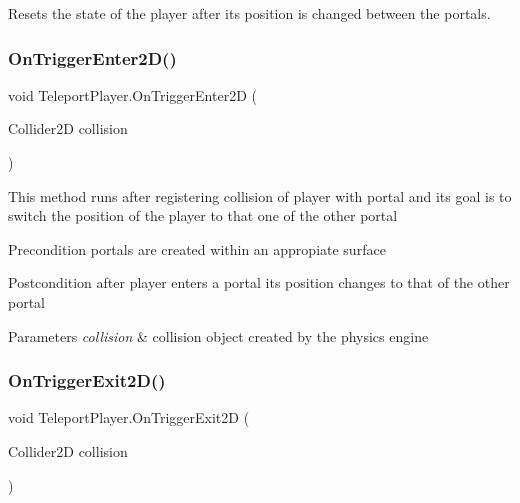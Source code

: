Resets the state of the player after its position is changed between the portals. \mbox{\label{class_teleport_player_a555b0c226c512d6bc9ce347b19957cd9}} 
\subsubsection{\texorpdfstring{On\+Trigger\+Enter2\+D()}{OnTriggerEnter2D()}}
{\footnotesize\ttfamily void Teleport\+Player.\+On\+Trigger\+Enter2D (\begin{DoxyParamCaption}\item[{Collider2D}]{collision }\end{DoxyParamCaption})\hspace{0.3cm}{\ttfamily [inline]}}

This method runs after registering collision of player with portal and its goal is to switch the position of the player to that one of the other portal \begin{DoxyPrecond}{Precondition}
portals are created within an appropiate surface 
\end{DoxyPrecond}
\begin{DoxyPostcond}{Postcondition}
after player enters a portal it\textquotesingle{}s position changes to that of the other portal 
\end{DoxyPostcond}

\begin{DoxyParams}{Parameters}
{\em collision} & collision object created by the physics engine \\
\hline
\end{DoxyParams}
\mbox{\label{class_teleport_player_addd6af261867cf134ac87c580cebec92}} 
\subsubsection{\texorpdfstring{On\+Trigger\+Exit2\+D()}{OnTriggerExit2D()}}
{\footnotesize\ttfamily void Teleport\+Player.\+On\+Trigger\+Exit2D (\begin{DoxyParamCaption}\item[{Collider2D}]{collision }\end{DoxyParamCaption})\hspace{0.3cm}{\ttfamily [inline]}}

